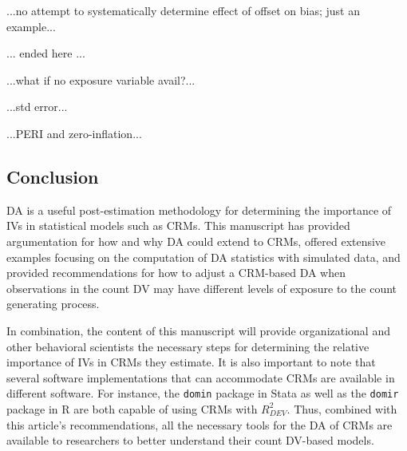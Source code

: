 \documentclass[ShortAfour,times,sageapa]{sagej}
\begin{document}
	...no attempt to systematically determine effect of offset on bias; just an example...
	
	... ended here ...
	
	...what if no exposure variable avail?...
	
	...std error...
	
	...PERI and zero-inflation...
	
	\subsection{Conclusion}
	
	DA is a useful post-estimation methodology for determining the importance of IVs in statistical models such as CRMs.
	This manuscript has provided argumentation for how and why DA could extend to CRMs, offered extensive examples focusing on the computation of DA statistics with simulated data, and provided recommendations for how to adjust a CRM-based DA when observations in the count DV may have different levels of exposure to the count generating process.
	
	In combination, the content of this manuscript will provide organizational and other behavioral scientists the necessary steps for determining the relative importance of IVs in CRMs they estimate.
	It is also important to note that several software implementations that can accommodate CRMs are available in different software.
	For instance, the \texttt{domin} package in Stata \cite{luchman2021determining} as well as the \texttt{domir} package in R \cite{luchman2022package} are both capable of using CRMs with $R^2_{DEV}$. 
	Thus, combined with this article's recommendations, all the necessary tools for the DA of CRMs are available to researchers to better understand their count DV-based models.




	
\end{document}
